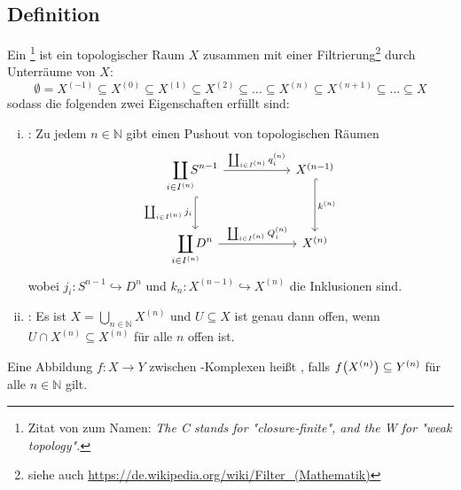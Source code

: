 \subsection[Definition: \CW-Komplex]{Definition} %
\label{sub:113}
Ein \footnote{Zitat von  zum Namen: \textenglish{\emph{The C stands for "closure-finite", and the W for "weak topology".}}} ist ein topologischer Raum $X$ zusammen mit einer Filtrierung\footnote{siehe auch \url{https://de.wikipedia.org/wiki/Filter_(Mathematik)}} durch Unterräume von $X$: 
\[
	\emptyset = X^{(-1)} \subseteq X^{(0)} \subseteq X^{(1)} \subseteq X^{(2)} \subseteq  \ldots \subseteq X^{(n)} \subseteq X^{(n+1)} \subseteq \ldots \subseteq X
\]
sodass die folgenden zwei Eigenschaften erfüllt sind:
\begin{enumerate}[(i)]
	\item {}: Zu jedem $n \in \mathds{N}$ gibt einen Pushout von topologischen Räumen 
	\[
		\begin{tikzcd}[row sep = large, column sep = 5.4em]
			\smashoperator{\coprod\limits_{i \in I^{(n)}}} S^{n-1} \rar["\coprod_{i \in I^{(n)}} q_i^{(n)}"] \dar["\coprod_{i \in I^{(n)}} j_i"', hook] 
			& X^{(n-1)} \dar[hook, "k^{(n)}"] \\
			\smashoperator{\coprod\limits_{i \in I^{(n)}}} D^n \rar["\coprod_{i \in I^{(n)}} Q_i^{(n)}"] & X^{(n)}
		\end{tikzcd}
	\]
	wobei $j_i \colon S^{n-1} \hookrightarrow D^n$ und $k_n \colon X^{(n-1)} \hookrightarrow X^{(n)}$ die Inklusionen sind.
	\item {}: Es ist $X= \bigcup_{n \in \mathds{N}} X^{(n)}$ und $U \subseteq X$ ist genau dann offen, wenn $U \cap X^{(n)} \subseteq X^{(n)}$ für 
	alle $n$ offen ist.
\end{enumerate}
Eine Abbildung $f \colon X \to Y$ zwischen \CW-Komplexen heißt , falls $f\enbrace*{X^{(n)}}\subseteq Y^{(n)}$ für alle $n \in \mathds{N}$ gilt. 

